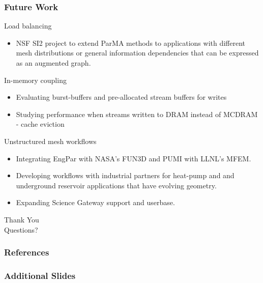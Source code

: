 \documentclass{beamer}
\begin{document}
\begin{frame}
  \frametitle{Future Work}
  Load balancing
  \begin{itemize}
    \item NSF SI2 project to extend ParMA methods to applications with different
      mesh distributions or general information dependencies that can be
      expressed as an augmented graph.
  \end{itemize}
  In-memory coupling 
  \begin{itemize}
    \item Evaluating burst-buffers and pre-allocated stream buffers for writes
    \item Studying performance when streams written to DRAM instead of MCDRAM - cache eviction
  \end{itemize}
  Unstructured mesh workflows
  \begin{itemize}
    \item Integrating EngPar with NASA's FUN3D and PUMI with LLNL's MFEM.
    \item Developing workflows with industrial partners for heat-pump and 
      and underground reservoir applications that have evolving geometry.
    \item Expanding Science Gateway support and userbase.
  \end{itemize}
\end{frame}

\begin{frame}
  \begin{center}
    {\huge
      Thank You\\
      \bigskip
      \bigskip
      \bigskip
      \bigskip
      \bigskip
      \large
      Questions?
    }
  \end{center}
\end{frame}


\begin{frame}
  \frametitle{References}
  \tiny
  
\end{frame}

\begin{frame}
  \frametitle{Additional Slides}
\end{frame}
\end{document}
